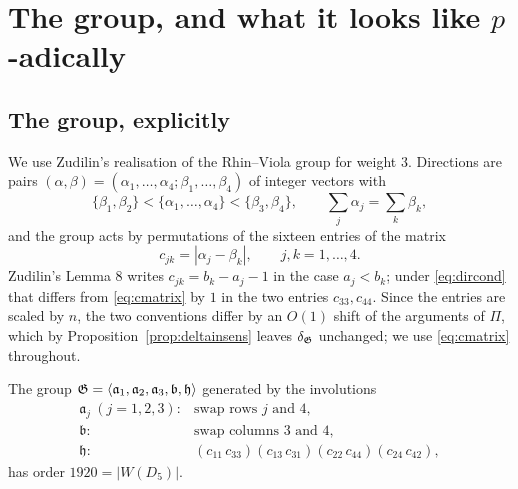 \section{The group, and what it looks like $p$-adically}\label{sec:group}

\subsection{The group, explicitly}\label{ss:groupexp}

We use Zudilin's realisation \cite[Lemma 8]{Zudilin2004} of the Rhin--Viola group for
weight $3$. Directions are pairs $(\alpha,\beta)=(\alpha_1,\dots,\alpha_4;\beta_1,\dots,\beta_4)$
of integer vectors with
\begin{equation}\label{eq:dircond}
 \{\beta_1,\beta_2\}<\{\alpha_1,\dots,\alpha_4\}<\{\beta_3,\beta_4\},
 \qquad \textstyle\sum_j\alpha_j=\sum_k\beta_k ,
\end{equation}
and the group acts by permutations of the sixteen entries of the matrix
\begin{equation}\label{eq:cmatrix}
 c_{jk}=|\alpha_j-\beta_k|,\qquad j,k=1,\dots,4 .
\end{equation}
Zudilin's Lemma 8 writes $c_{jk}=b_k-a_j-1$ in the case $a_j<b_k$; under
\eqref{eq:dircond} that differs from \eqref{eq:cmatrix} by $1$ in the two entries
$c_{33},c_{44}$. Since the entries are scaled by $n$, the two conventions differ by an
$O(1)$ shift of the arguments of $\Pi$, which by Proposition~\ref{prop:deltainsens} leaves
$\delta_{\mathfrak{G}}$ unchanged; we use \eqref{eq:cmatrix} throughout.

\begin{proposition}\label{prop:group}
 The group
$\mathfrak{G}=\langle\mathfrak a_1,\mathfrak a_2,\mathfrak a_3,\mathfrak b,\mathfrak h\rangle$
generated by the involutions
\[
\begin{array}{ll}
 \mathfrak a_j\ (j=1,2,3): & \text{swap rows }j\text{ and }4,\\
 \mathfrak b: & \text{swap columns }3\text{ and }4,\\
 \mathfrak h: & (c_{11}\,c_{33})(c_{13}\,c_{31})(c_{22}\,c_{44})(c_{24}\,c_{42}),
\end{array}
\]
has order $1920=|W(D_5)|$.
\end{proposition}

